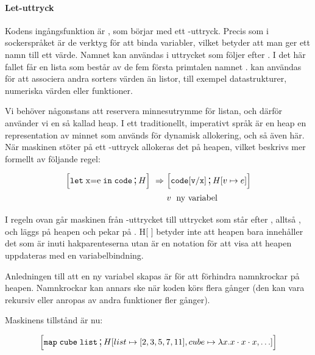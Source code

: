 \documentclass[../Core]{subfiles}
\begin{document}
\paragraph{Let-uttryck}
Kodens ingångsfunktion är , som börjar med ett -uttryck.
Precis som i sockerspråket är de verktyg för att binda variabler, 
vilket betyder att man ger ett
namn till ett värde. Namnet kan användas i uttrycket som följer efter .
I det här fallet får en lista som består av de fem första primtalen namnet .
 kan användas för att associera andra sorters värden än listor,
till exempel datastrukturer, numeriska värden eller funktioner.

 Vi behöver någonstans att reservera minnesutrymme för listan, och därför
använder vi en så kallad heap. I ett traditionellt, imperativt språk är
en heap en representation av minnet som används för dynamisk allokering,
och så även här. När
maskinen stöter på ett -uttryck allokeras det på heapen, vilket
beskrivs mer formellt av följande regel:

\begin{align*}
\text{\large$$}\Big[\mathtt{let\;\mathrm{x\mathtt{=}e}\; in\; code} \,\text{\Large;}\, H\Big]\,\,\Rightarrow\,\, & \text{\large$$}\Big[\mathtt{code[v/x]} \,\text{\Large;}\, H[v\mapsto e]\Big] \\
 & v\; \text{ ny variabel} \nonumber
\end{align*}

I regeln ovan går maskinen från -uttrycket till
uttrycket som står efter , alltså ,
och  läggs på heapen och pekar på .
H{[} {]} betyder inte att heapen bara innehåller det som är inuti
hakparenteserna utan är en notation för att visa att heapen
uppdateras med en variabelbindning.

Anledningen till att en ny variabel  skapas är för att förhindra 
namnkrockar på heapen. Namnkrockar kan annars ske när koden körs flera gånger 
(den kan vara rekursiv eller anropas av andra funktioner fler gånger). 


Maskinens tillstånd är nu:

\begin{align*}
\text{\large$$}\Big[\mathtt{map\; cube\; list} \,\text{\Large;}\, H[list\mapsto[2,3,5,7,11],cube\mapsto\lambda x.x\cdot x\cdot x,\ldots]\Big]
\end{align*}
\end{document}
